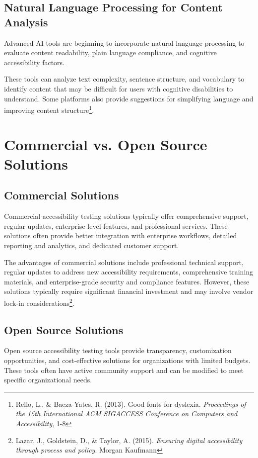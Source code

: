 \subsection{Natural Language Processing for Content Analysis}

Advanced AI tools are beginning to incorporate natural language processing to evaluate content readability, plain language compliance, and cognitive accessibility factors.

These tools can analyze text complexity, sentence structure, and vocabulary to identify content that may be difficult for users with cognitive disabilities to understand. Some platforms also provide suggestions for simplifying language and improving content structure\footnote{Rello, L., \& Baeza-Yates, R. (2013). Good fonts for dyslexia. \textit{Proceedings of the 15th International ACM SIGACCESS Conference on Computers and Accessibility}, 1-8}.

\section{Commercial vs. Open Source Solutions}

\subsection{Commercial Solutions}

Commercial accessibility testing solutions typically offer comprehensive support, regular updates, enterprise-level features, and professional services. These solutions often provide better integration with enterprise workflows, detailed reporting and analytics, and dedicated customer support.

The advantages of commercial solutions include professional technical support, regular updates to address new accessibility requirements, comprehensive training materials, and enterprise-grade security and compliance features. However, these solutions typically require significant financial investment and may involve vendor lock-in considerations\footnote{Lazar, J., Goldstein, D., \& Taylor, A. (2015). \textit{Ensuring digital accessibility through process and policy}. Morgan Kaufmann}.

\subsection{Open Source Solutions}

Open source accessibility testing tools provide transparency, customization opportunities, and cost-effective solutions for organizations with limited budgets. These tools often have active community support and can be modified to meet specific organizational needs.

